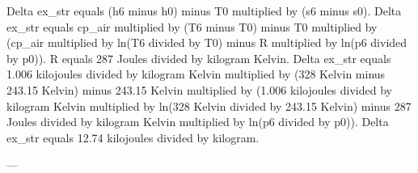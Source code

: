 Delta ex_str equals (h6 minus h0) minus T0 multiplied by (s6 minus s0).  
Delta ex_str equals cp_air multiplied by (T6 minus T0) minus T0 multiplied by (cp_air multiplied by ln(T6 divided by T0) minus R multiplied by ln(p6 divided by p0)).  
R equals 287 Joules divided by kilogram Kelvin.  
Delta ex_str equals 1.006 kilojoules divided by kilogram Kelvin multiplied by (328 Kelvin minus 243.15 Kelvin) minus 243.15 Kelvin multiplied by (1.006 kilojoules divided by kilogram Kelvin multiplied by ln(328 Kelvin divided by 243.15 Kelvin) minus 287 Joules divided by kilogram Kelvin multiplied by ln(p6 divided by p0)).  
Delta ex_str equals 12.74 kilojoules divided by kilogram.  

---